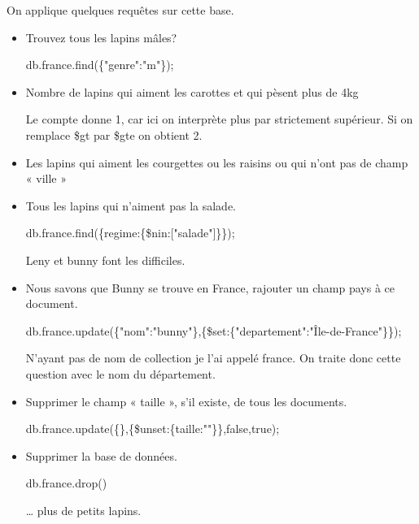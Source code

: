 On applique quelques requêtes sur cette base.
\begin{itemize}
    \item Trouvez tous les lapins mâles? \newline
        \begin{tt} db.france.find(\{"genre":"m"\}); \end{tt} 
        
    \item Nombre de lapins qui aiment les carottes et qui pèsent plus de 4kg \newline
        \begin{tt} db.france.find(\{regime :\{\$all:[‘carotte’]\},poids:\{\$gt:4\}}).count();\end{tt}\newline
        Le compte donne 1, car ici on interprète plus par strictement supérieur. Si on remplace \$gt par \$gte on obtient 2.
        
    \item Les lapins qui aiment les courgettes ou les raisins ou qui n’ont pas de champ « ville »\newline
        \begin{tt} db.france.find(\{\$or:[{regime:\{\$in:["salade","courgette"]\}\},\{ville:null\}]\}); \end{tt}
        \item Tous les lapins qui n’aiment pas la salade.\newline
        \begin{tt} db.france.find(\{regime:\{\$nin:["salade"]\}\}); \end{tt} \newline
        Leny et bunny font les difficiles.
        
    \item Nous savons que Bunny se trouve en France, rajouter un champ pays à ce document.
        \begin{tt} db.france.update(\{"nom":"bunny"\},\{\$set:\{"departement":"Île-de-France"\}\}); \end{tt}
        N’ayant pas de nom de collection je l’ai appelé france. On traite donc cette question avec le nom du département.

    \item Supprimer le champ « taille », s’il existe, de tous les documents.\newline
        \begin{tt} db.france.update(\{\},\{\$unset:\{taille:""\}\},false,true); \end{tt}
        
    \item Supprimer la base de données.\newline
        \begin{tt} db.france.drop() \end{tt} \newline
        … plus de petits lapins.
    \end{itemize}